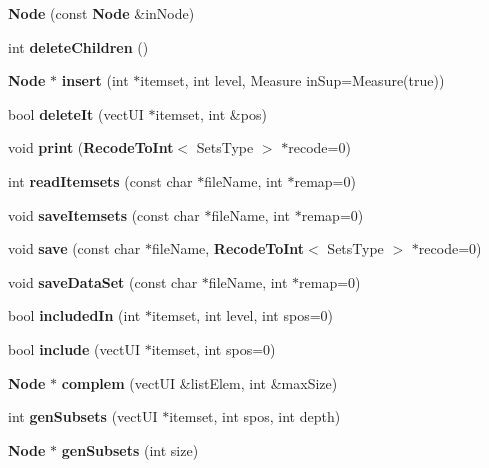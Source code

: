 \begin{CompactItemize}
\item 
{\bf Node} (const {\bf Node} \&in\-Node)
\item 
int {\bf delete\-Children} ()
\item 
{\bf Node} $\ast$ {\bf insert} (int $\ast$itemset, int level, Measure in\-Sup=Measure(true))
\item 
bool {\bf delete\-It} (vect\-UI $\ast$itemset, int \&pos)
\item 
void {\bf print} ({\bf Recode\-To\-Int}$<$ Sets\-Type $>$ $\ast$recode=0)
\item 
int {\bf read\-Itemsets} (const char $\ast$file\-Name, int $\ast$remap=0)
\item 
void {\bf save\-Itemsets} (const char $\ast$file\-Name, int $\ast$remap=0)
\item 
void {\bf save} (const char $\ast$file\-Name, {\bf Recode\-To\-Int}$<$ Sets\-Type $>$ $\ast$recode=0)
\item 
void {\bf save\-Data\-Set} (const char $\ast$file\-Name, int $\ast$remap=0)
\item 
bool {\bf included\-In} (int $\ast$itemset, int level, int spos=0)
\item 
bool {\bf include} (vect\-UI $\ast$itemset, int spos=0)
\item 
{\bf Node} $\ast$ {\bf complem} (vect\-UI \&list\-Elem, int \&max\-Size)
\item 
int {\bf gen\-Subsets} (vect\-UI $\ast$itemset, int spos, int depth)
\item 
{\bf Node} $\ast$ {\bf gen\-Subsets} (int size)
\end{CompactItemize}
